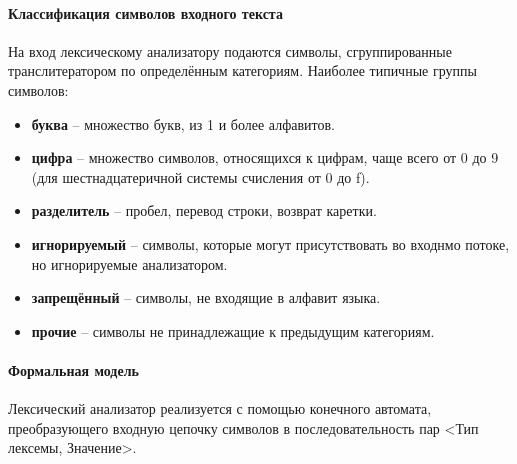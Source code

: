 \documentclass[a4paper,final]{article}
\begin{document}
\paragraph{Классификация символов входного текста\\[1em]}

На вход лексическому анализатору подаются символы, сгруппированные транслитератором по определённым категориям. Наиболее типичные группы символов:
\begin{itemize}
    \item \textbf{буква} -- множество букв, из 1 и более алфавитов.
    \item \textbf{цифра} -- множество символов, относящихся к цифрам, чаще всего от 0 до 9 (для шестнадцатеричной системы счисления от 0 до f).
    \item \textbf{разделитель} -- пробел, перевод строки, возврат каретки.
    \item \textbf{игнорируемый} -- символы, которые могут присутствовать во входнмо потоке, но игнорируемые анализатором.
    \item \textbf{запрещённый} -- символы, не входящие в алфавит языка.
    \item \textbf{прочие} -- символы не принадлежащие к предыдущим категориям.
\end{itemize}

\paragraph{Формальная модель\\[1em]}
Лексический анализатор реализуется с помощью конечного автомата, преобразующего входную цепочку символов в последовательность пар <Тип лексемы, Значение>.
\end{document}
